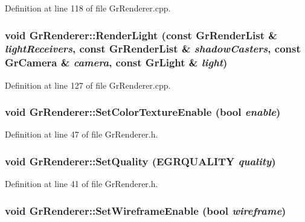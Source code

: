 Definition at line 118 of file GrRenderer.cpp.\hypertarget{class_gr_renderer_e67d78d01c3f6c8cd69cec7eeeeb8e03}{
\subsubsection[{RenderLight}]{\setlength{\rightskip}{0pt plus 5cm}void GrRenderer::RenderLight (const {\bf GrRenderList} \& {\em lightReceivers}, \/  const {\bf GrRenderList} \& {\em shadowCasters}, \/  const {\bf GrCamera} \& {\em camera}, \/  const {\bf GrLight} \& {\em light})}}
\label{class_gr_renderer_e67d78d01c3f6c8cd69cec7eeeeb8e03}




Definition at line 127 of file GrRenderer.cpp.\hypertarget{class_gr_renderer_ea31969cc28ebbae05209c9df2c56d06}{
\subsubsection[{SetColorTextureEnable}]{\setlength{\rightskip}{0pt plus 5cm}void GrRenderer::SetColorTextureEnable (bool {\em enable})}}
\label{class_gr_renderer_ea31969cc28ebbae05209c9df2c56d06}




Definition at line 47 of file GrRenderer.h.\hypertarget{class_gr_renderer_b8ae722c5f5d7667364f0d2f566c83a6}{
\subsubsection[{SetQuality}]{\setlength{\rightskip}{0pt plus 5cm}void GrRenderer::SetQuality ({\bf EGRQUALITY} {\em quality})}}
\label{class_gr_renderer_b8ae722c5f5d7667364f0d2f566c83a6}




Definition at line 41 of file GrRenderer.h.\hypertarget{class_gr_renderer_b3dd5cf678f215b7867cf641c2319498}{
\subsubsection[{SetWireframeEnable}]{\setlength{\rightskip}{0pt plus 5cm}void GrRenderer::SetWireframeEnable (bool {\em wireframe})}}
\label{class_gr_renderer_b3dd5cf678f215b7867cf641c2319498}




